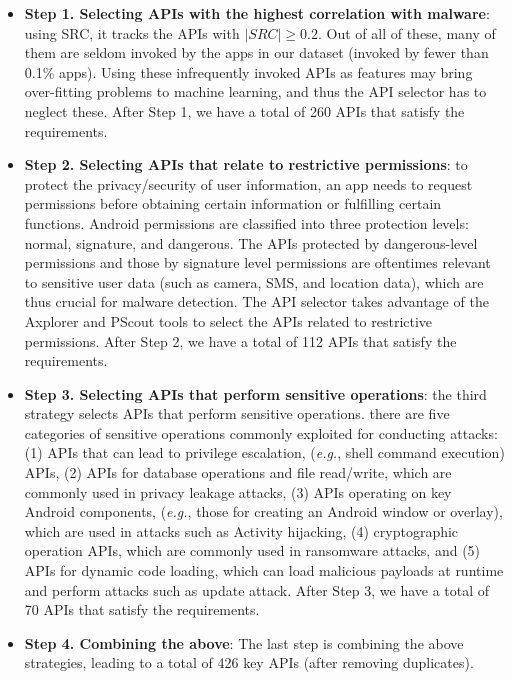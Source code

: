 \begin{itemize}
    \item \textbf{Step 1. Selecting APIs with the highest correlation with malware}: using SRC, it tracks the APIs with $|SRC|\geq0.2$. Out of all of these, many of them are seldom invoked by the apps in our dataset (invoked by fewer than 0.1\% apps). Using these infrequently invoked APIs as features may bring over-fitting problems to machine learning, and thus the API selector has to neglect these. After Step 1, we have a total of 260 APIs that satisfy the requirements.
    \item \textbf{Step 2. Selecting APIs that relate to restrictive permissions}: to protect the privacy/security of user information, an app needs to request permissions before obtaining certain information or fulfilling certain functions. Android permissions are classified into three protection levels: normal, signature, and dangerous. The APIs protected by dangerous-level permissions and those by signature level permissions are oftentimes relevant to sensitive user data (such as camera, SMS, and location data), which are thus crucial for malware detection. The API selector takes advantage of the Axplorer \cite{backes2016demystifying} and PScout \cite{au2012pscout} tools to select the APIs related to restrictive permissions. After Step 2, we have a total of 112 APIs that satisfy the requirements.
    \item \textbf{Step 3. Selecting APIs that perform sensitive operations}: the third strategy selects APIs that perform sensitive operations. there are five categories of sensitive operations commonly exploited for conducting attacks: (1) APIs that can lead to privilege escalation, (\textit{e.g.}, shell command execution) APIs, (2) APIs for database operations and file read/write, which are commonly used in privacy leakage attacks, (3) APIs operating on key Android components, (\textit{e.g.}, those for creating an Android window or overlay), which are used in attacks such as Activity hijacking, (4) cryptographic operation APIs, which are commonly used in ransomware attacks, and (5) APIs for dynamic code loading, which can load malicious payloads at runtime and perform attacks such as update attack. After Step 3, we have a total of 70 APIs that satisfy the requirements.
    \item \textbf{Step 4. Combining the above}: The last step is combining the above strategies, leading to a total of 426 key APIs (after removing duplicates).
\end{itemize}

